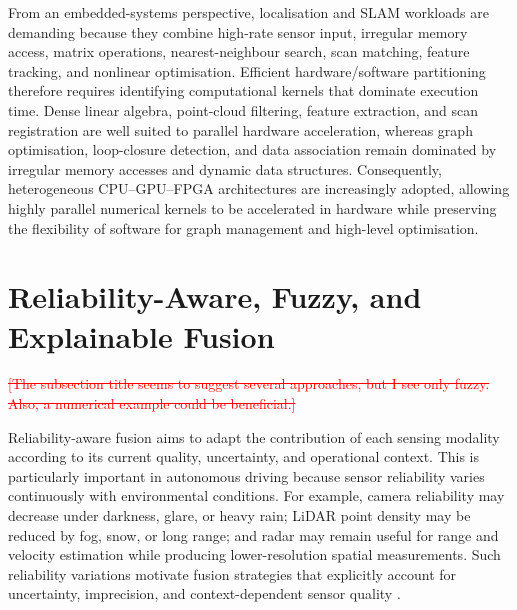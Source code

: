 \documentclass[11pt,oneside,openany]{book}
\newcommand{\deleted}[1]{\textcolor{red}{\sout{#1}}}
\begin{document}
From an embedded-systems perspective, localisation and SLAM workloads are demanding because they combine high-rate sensor input, irregular memory access, matrix operations, nearest-neighbour search, scan matching, feature tracking, and nonlinear optimisation. Efficient hardware/software partitioning therefore requires identifying computational kernels that dominate execution time. Dense linear algebra, point-cloud filtering, feature extraction, and scan registration are well suited to parallel hardware acceleration, whereas graph optimisation, loop-closure detection, and data association remain dominated by irregular memory accesses and dynamic data structures. Consequently, heterogeneous CPU--GPU--FPGA architectures are increasingly adopted, allowing highly parallel numerical kernels to be accelerated in hardware while preserving the flexibility of software for graph management and high-level optimisation.

\section{Reliability-Aware, Fuzzy, and Explainable Fusion}

\deleted{[The subsection title seems to suggest several approaches, but I see only fuzzy. Also, a numerical example could be beneficial.]} %


Reliability-aware fusion aims to adapt the contribution of each sensing modality according to its current quality, uncertainty, and operational context. This is particularly important in autonomous driving because sensor reliability varies continuously with environmental conditions. For example, camera reliability may decrease under darkness, glare, or heavy rain; LiDAR point density may be reduced by fog, snow, or long range; and radar may remain useful for range and velocity estimation while producing lower-resolution spatial measurements. Such reliability variations motivate fusion strategies that explicitly account for uncertainty, imprecision, and context-dependent sensor quality \cite{khaleghi_multisensor_2013, hall_introduction_1997}.
\end{document}
